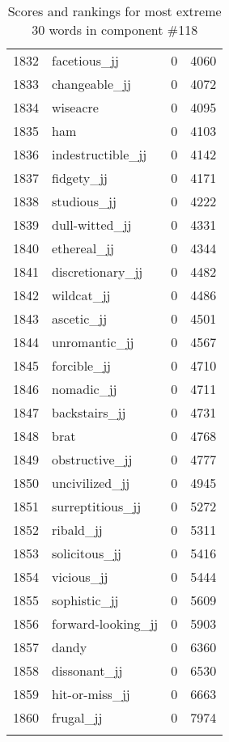 \begin{longtable}[!htbp]{| rlr@{.}l |}
    1832 & facetious\_jj & 0 & 4060 \\
    1833 & changeable\_jj & 0 & 4072 \\
    1834 & wiseacre & 0 & 4095 \\
    1835 & ham & 0 & 4103 \\
    1836 & indestructible\_jj & 0 & 4142 \\
    1837 & fidgety\_jj & 0 & 4171 \\
    1838 & studious\_jj & 0 & 4222 \\
    1839 & dull-witted\_jj & 0 & 4331 \\
    1840 & ethereal\_jj & 0 & 4344 \\
    1841 & discretionary\_jj & 0 & 4482 \\
    1842 & wildcat\_jj & 0 & 4486 \\
    1843 & ascetic\_jj & 0 & 4501 \\
    1844 & unromantic\_jj & 0 & 4567 \\
    1845 & forcible\_jj & 0 & 4710 \\
    1846 & nomadic\_jj & 0 & 4711 \\
    1847 & backstairs\_jj & 0 & 4731 \\
    1848 & brat & 0 & 4768 \\
    1849 & obstructive\_jj & 0 & 4777 \\
    1850 & uncivilized\_jj & 0 & 4945 \\
    1851 & surreptitious\_jj & 0 & 5272 \\
    1852 & ribald\_jj & 0 & 5311 \\
    1853 & solicitous\_jj & 0 & 5416 \\
    1854 & vicious\_jj & 0 & 5444 \\
    1855 & sophistic\_jj & 0 & 5609 \\
    1856 & forward-looking\_jj & 0 & 5903 \\
    1857 & dandy & 0 & 6360 \\
    1858 & dissonant\_jj & 0 & 6530 \\
    1859 & hit-or-miss\_jj & 0 & 6663 \\
    1860 & frugal\_jj & 0 & 7974 \\
    \hline
    \caption{Scores and rankings for most extreme 30 words in component \#118} \\
\end{longtable}
